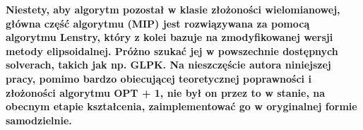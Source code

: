 \textbf{Niestety, aby algorytm pozostał w klasie złożoności wielomianowej, główna część algorytmu (MIP) jest rozwiązywana za pomocą algorytmu Lenstry, który z kolei bazuje na zmodyfikowanej wersji metody elipsoidalnej. Próżno szukać jej w powszechnie dostępnych solverach, takich jak np. GLPK.
Na nieszczęście autora niniejszej pracy, pomimo bardzo obiecującej teoretycznej poprawności i złożoności algorytmu OPT + 1, nie był on przez to w stanie, na obecnym etapie kształcenia, zaimplementować go w oryginalnej formie samodzielnie.}  


